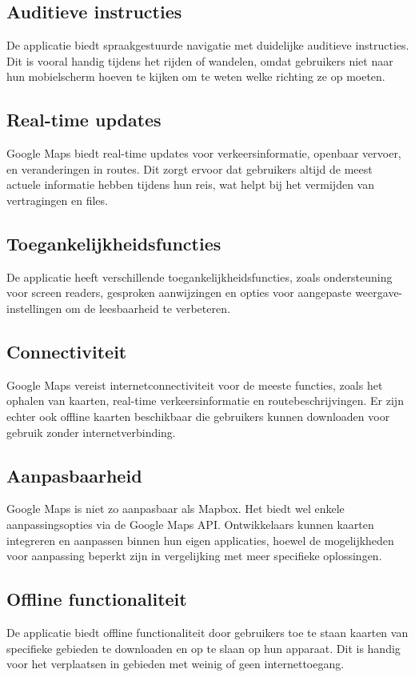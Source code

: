 \subsection*{Auditieve instructies}
De applicatie biedt spraakgestuurde navigatie met duidelijke auditieve instructies. Dit is vooral handig tijdens het rijden of wandelen, omdat gebruikers niet naar hun mobielscherm hoeven te kijken om te weten welke richting ze op moeten.

\subsection*{Real-time updates}
Google Maps biedt real-time updates voor verkeersinformatie, openbaar vervoer, en veranderingen in routes. Dit zorgt ervoor dat gebruikers altijd de meest actuele informatie hebben tijdens hun reis, wat helpt bij het vermijden van vertragingen en files.

\subsection*{Toegankelijkheidsfuncties}
De applicatie heeft verschillende toegankelijkheidsfuncties, zoals ondersteuning voor screen readers, gesproken aanwijzingen en opties voor aangepaste weergave-instellingen om de leesbaarheid te verbeteren.

\subsection*{Connectiviteit}
Google Maps vereist internetconnectiviteit voor de meeste functies, zoals het ophalen van kaarten, real-time verkeersinformatie en routebeschrijvingen. Er zijn echter ook offline kaarten beschikbaar die gebruikers kunnen downloaden voor gebruik zonder internetverbinding.

\subsection*{Aanpasbaarheid}
Google Maps is niet zo aanpasbaar als Mapbox. Het biedt wel enkele aanpassingsopties via de Google Maps API. Ontwikkelaars kunnen kaarten integreren en aanpassen binnen hun eigen applicaties, hoewel de mogelijkheden voor aanpassing beperkt zijn in vergelijking met meer specifieke oplossingen.

\subsection*{Offline functionaliteit}
De applicatie biedt offline functionaliteit door gebruikers toe te staan kaarten van specifieke gebieden te downloaden en op te slaan op hun apparaat. Dit is handig voor het verplaatsen in gebieden met weinig of geen internettoegang.

